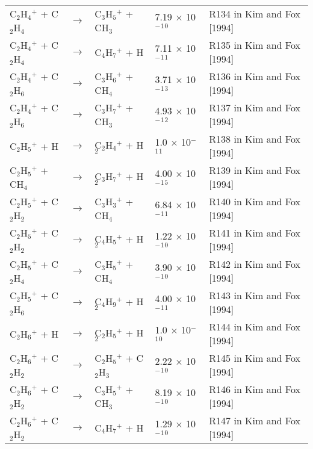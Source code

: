 \documentclass[10pt,a4paper]{jarticle}
\begin{document}
\begin{table}[htb]
{\begin{tabular}{lclll}
 C$_2$H$_4$$^+$ + C$_2$H$_4$     & $\rightarrow$ & C$_3$H$_5$$^+$ + CH$_3$           & 7.19 $\times$ 10$^-$$^1$$^0$ & R134 in Kim and Fox [1994] \\
 C$_2$H$_4$$^+$ + C$_2$H$_4$     & $\rightarrow$ & C$_4$H$_7$$^+$ + H             & 7.11 $\times$ 10$^-$$^1$$^1$ & R135 in Kim and Fox [1994] \\
 C$_2$H$_4$$^+$ + C$_2$H$_6$     & $\rightarrow$ & C$_3$H$_6$$^+$ + CH$_4$           & 3.71 $\times$ 10$^-$$^1$$^3$ & R136 in Kim and Fox [1994] \\
 C$_2$H$_4$$^+$ + C$_2$H$_6$     & $\rightarrow$ & C$_3$H$_7$$^+$ + CH$_3$           & 4.93 $\times$ 10$^-$$^1$$^2$ & R137 in Kim and Fox [1994] \\
 C$_2$H$_5$$^+$ + H        & $\rightarrow$ & C$_2$H$_4$$^+$ + H$_2$            & 1.0 $\times$ 10$^-$$^1$$^1$ & R138 in Kim and Fox [1994] \\
 C$_2$H$_5$$^+$ + CH$_4$      & $\rightarrow$ & C$_3$H$_7$$^+$ + H$_2$            & 4.00 $\times$ 10$^-$$^1$$^5$ & R139 in Kim and Fox [1994] \\
 C$_2$H$_5$$^+$ + C$_2$H$_2$     & $\rightarrow$ & C$_3$H$_3$$^+$ + CH$_4$           & 6.84 $\times$ 10$^-$$^1$$^1$ & R140 in Kim and Fox [1994] \\
 C$_2$H$_5$$^+$ + C$_2$H$_2$     & $\rightarrow$ & C$_4$H$_5$$^+$ + H$_2$            & 1.22 $\times$ 10$^-$$^1$$^0$ & R141 in Kim and Fox [1994] \\
 C$_2$H$_5$$^+$ + C$_2$H$_4$     & $\rightarrow$ & C$_3$H$_5$$^+$ + CH$_4$           & 3.90 $\times$ 10$^-$$^1$$^0$ & R142 in Kim and Fox [1994] \\
 C$_2$H$_5$$^+$ + C$_2$H$_6$     & $\rightarrow$ & C$_4$H$_9$$^+$ + H$_2$            & 4.00 $\times$ 10$^-$$^1$$^1$ & R143 in Kim and Fox [1994] \\
 C$_2$H$_6$$^+$ + H        & $\rightarrow$ & C$_2$H$_5$$^+$ + H$_2$            & 1.0 $\times$ 10$^-$$^1$$^0$ & R144 in Kim and Fox [1994] \\
 C$_2$H$_6$$^+$ + C$_2$H$_2$     & $\rightarrow$ & C$_2$H$_5$$^+$ + C$_2$H$_3$          & 2.22 $\times$ 10$^-$$^1$$^0$ & R145 in Kim and Fox [1994] \\
 C$_2$H$_6$$^+$ + C$_2$H$_2$     & $\rightarrow$ & C$_3$H$_5$$^+$ + CH$_3$           & 8.19 $\times$ 10$^-$$^1$$^0$ & R146 in Kim and Fox [1994] \\
 C$_2$H$_6$$^+$ + C$_2$H$_2$     & $\rightarrow$ & C$_4$H$_7$$^+$ + H             & 1.29 $\times$ 10$^-$$^1$$^0$ & R147 in Kim and Fox [1994] \\

\end{tabular}}
\end{table}
\end{document}
